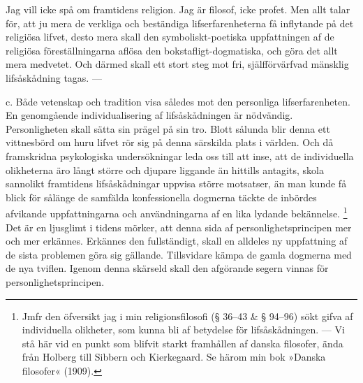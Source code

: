 \documentclass[12pt]{article}
\newcommand{\opage}[1]{\marginnote{\footnotesize\textit{[#1]}}}
\begin{document}
Jag vill icke spå om framtidens religion. Jag är filosof, icke profet. Men allt talar för, att ju mera de verkliga och beständiga lifserfarenheterna få inflytande på det religiösa lifvet, desto mera skall den symboliskt-poetiska uppfattningen af de religiösa föreställningarna aflösa den bokstafligt-dogmatiska, och göra det allt mera medvetet. Och därmed skall ett stort steg mot fri, själfförvärfvad mänsklig lifsåskådning tagas. ---

c. Både vetenskap och tradition visa %
\opage{69}
således mot den personliga lifserfarenheten. En genomgående individualisering af lifsåskådningen är nödvändig. Personligheten skall sätta sin prägel på sin tro. Blott sålunda blir denna ett vittnesbörd om huru lifvet rör sig på denna särskilda plats i världen. Och då framskridna psykologiska undersökningar leda oss till att inse, att de individuella olikheterna äro långt större och djupare liggande än hittills antagits, skola sannolikt framtidens lifsåskådningar uppvisa större motsatser, än man kunde få blick för sålänge de samfälda konfessionella dogmerna täckte de inbördes afvikande uppfattningarna och användningarna af en lika lydande bekännelse.%
\footnote[1]{Jmfr den öfversikt jag i min religionsfilosofi (§ 36--43 \& § 94--96) sökt gifva af individuella olikheter, som kunna bli af betydelse för lifsåskådningen. --- Vi stå här vid en punkt som blifvit starkt framhållen af danska filosofer, ända från Holberg till Sibbern och Kierkegaard. Se härom min bok »Danska filosofer« (1909).} Det är en ljusglimt i tidens mörker, att denna sida af personlighetsprincipen mer och mer erkännes. Erkännes den fullständigt, skall en alldeles ny uppfattning af de sista problemen göra sig gällande. Tillsvidare %
\opage{70}
kämpa de gamla dogmerna med de nya tviflen. Igenom denna skärseld skall den afgörande segern vinnas för personlighetsprincipen.
\end{document}
